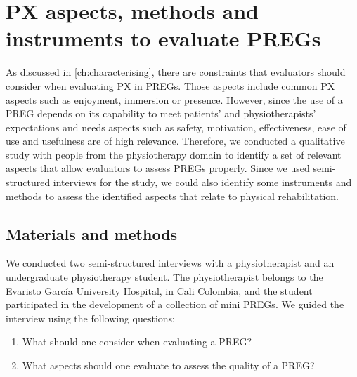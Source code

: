 \chapter{PX aspects, methods and instruments to evaluate \acp{PREG}}
\label{ch:aspects}

As discussed in \autoref{ch:characterising}, there are constraints that evaluators should consider when evaluating \ac{PX} in \acp{PREG}. Those aspects include common \ac{PX} aspects such as enjoyment, immersion or presence. However, since the use of a \ac{PREG} depends on its capability to meet patients' and physiotherapists' expectations and needs aspects such as safety, motivation, effectiveness, ease of use and usefulness are of high relevance. Therefore, we conducted a qualitative study with people from the physiotherapy domain to identify a set of relevant aspects that allow evaluators to assess \acp{PREG} properly. Since we used semi-structured interviews for the study, we could also identify some instruments and methods to assess the identified aspects that relate to physical rehabilitation.


\section{Materials and methods} %
\label{sec:mats_mets_aspects}
We conducted two semi-structured interviews with a physiotherapist and an undergraduate physiotherapy student. The physiotherapist belongs to the Evaristo Garc\'ia University Hospital, in Cali Colombia, and the student participated in the development of a collection of mini \acp{PREG}. We guided the interview using the following questions:

\begin{enumerate}
    \item What should one consider when evaluating a \ac{PREG}?
    \item What aspects should one evaluate to assess the quality of a \ac{PREG}?
\end{enumerate}

